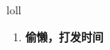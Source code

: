 
\begin{frame}
{\huge loll}
\begin{center}
\begin{enumerate}\Large
  \item \textbf{偷懒，打发时间}
\end{enumerate}
\end{center}
\end{frame}
